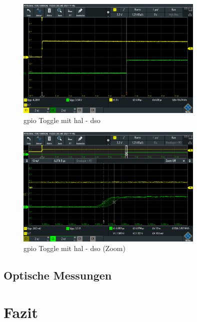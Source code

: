 \documentclass[11pt,a4paper,hidelinks]{article}
\begin{document}
\begin{figure}[H]
    \centering
    \includegraphics[width=0.8\textwidth]{graphics/gpio_toggle_with_hal_dso.png}
    \caption{\acrshort{gpio} Toggle mit \acrshort{hal} - \acrshort{dso}}\label{fig:gpio_toggle_with_hal_dso}
\end{figure}

\begin{figure}[H]
    \centering
    \includegraphics[width=0.8\textwidth]{graphics/gpio_toggle_with_hal_dso_zoom.png}
    \caption{\acrshort{gpio} Toggle mit \acrshort{hal} - \acrshort{dso} (Zoom)}\label{fig:gpio_toggle_with_hal_dso_zoom}
\end{figure}

\pagebreak

\subsection{Optische Messungen}

\pagebreak

\section{Fazit}
\end{document}
